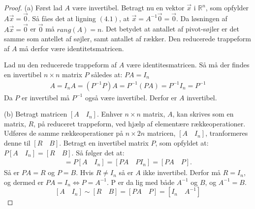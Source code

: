 \begin{proof}
(a) Først lad $A$ være invertibel. Betragt nu en vektor $\vec{x}$ i $\mathds{R}^n$, som opfylder $A\vec{x}=\vec{0}$. Så fåes det at ligning $(4.1)$, at $\vec{x}=A^{-1} \vec{0}=\vec{0}$. Da løsningen af  $A\vec{x}=\vec{0}$ er $\vec{0}$ må $rang(A)=n$. Det betydet at antallet af pivot-søjler er det samme som antellet af søjler, samt antallet af rækker. Den reducerede trappeform af $A$ må derfor være identitetsmatricen. 

Lad nu den reducerede trappeform af $A$ være identitesmatricen. Så må der findes en invertibel $n \times n$ matrix $P$ således at: $PA=I_n$
\begin{align*}
A=I_nA=(P^{-1}P)A=P^{-1}(PA)=P^{-1}I_n=P^{-1}
\end{align*}
Da $P$ er invertibel må $P^{-1}$ også være invertibel. Derfor er $A$ invertibel. 

(b) Betragt matricen $[A \quad I_n]$. Enhver $n \times n$ matrix, $A$, kan skrives som en matrix, $R$, på reduceret trappeform, ved hjælp af elementære rækkeoperationer. Udføres de samme rækkeoperationer på $n \times 2n$ matricen, $[A \quad I_n]$, tranformeres denne til $[R \quad B]$. Betragt en invertibel matrix $P$, som opfyldet at: $P[A \quad I_n]=[R \quad B]$. Så følger det at:  
\begin{align*}
[R \quad B]=P[A \quad I_n]=[PA \quad PI_n]=[PA \quad P]. 
\end{align*}
Så er $PA=R$ og $P=B$. Hvis $R \neq I_n$ så er $A$ ikke invertibel. Derfor må $R=I_n$, og dermed er $PA=I_n\Leftrightarrow P=A^{-1}$. P er da lig med både $A^{-1}$ og $B$, og $A^{-1}=B$. 
$$[A \quad I_n]\sim[R \quad B]=[PA \quad P]=[I_n \quad A^{-1}]$$
\end{proof}

